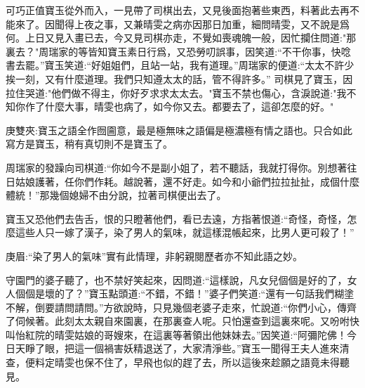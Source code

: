 \begin{parag}
    可巧正值寶玉從外而入，一見帶了司棋出去，又見後面抱著些東西，料著此去再不能來了。因聞得上夜之事，又兼晴雯之病亦因那日加重，細問晴雯，又不說是爲何。上日又見入畫已去，今又見司棋亦走，不覺如喪魂魄一般，因忙攔住問道:"那裏去？"周瑞家的等皆知寶玉素日行爲，又恐勞叨誤事，因笑道:“不干你事，快唸書去罷。”寶玉笑道:“好姐姐們，且站一站，我有道理。”周瑞家的便道:“太太不許少挨一刻，又有什麼道理。我們只知遵太太的話，管不得許多。” 司棋見了寶玉，因拉住哭道:"他們做不得主，你好歹求求太太去。"寶玉不禁也傷心，含淚說道:"我不知你作了什麼大事，晴雯也病了，如今你又去。都要去了，這卻怎麼的好。"\begin{note}庚雙夾:寶玉之語全作囫圇意，最是極無味之語偏是極濃極有情之語也。只合如此寫方是寶玉，稍有真切則不是寶玉了。\end{note}周瑞家的發躁向司棋道:“你如今不是副小姐了，若不聽話，我就打得你。別想著往日姑娘護著，任你們作耗。越說著，還不好走。如今和小爺們拉拉扯扯，成個什麼體統！”那幾個媳婦不由分說，拉著司棋便出去了。
\end{parag}


\begin{parag}
    寶玉又恐他們去告舌，恨的只瞪著他們，看已去遠，方指著恨道:“奇怪，奇怪，怎麼這些人只一嫁了漢子，染了男人的氣味，就這樣混帳起來，比男人更可殺了！”\begin{note}庚眉:“染了男人的氣味”實有此情理，非躬親閱歷者亦不知此語之妙。\end{note}守園門的婆子聽了，也不禁好笑起來，因問道:“這樣說，凡女兒個個是好的了，女人個個是壞的了？”寶玉點頭道:“不錯，不錯！”婆子們笑道:“還有一句話我們糊塗不解，倒要請問請問。”方欲說時，只見幾個老婆子走來，忙說道:“你們小心，傳齊了伺候著。此刻太太親自來園裏，在那裏查人呢。只怕還查到這裏來呢。又吩咐快叫怡紅院的晴雯姑娘的哥嫂來，在這裏等著領出他妹妹去。”因笑道:“阿彌陀佛！今日天睜了眼，把這一個禍害妖精退送了，大家清淨些。”寶玉一聞得王夫人進來清查，便料定晴雯也保不住了，早飛也似的趕了去，所以這後來趁願之語竟未得聽見。
\end{parag}


